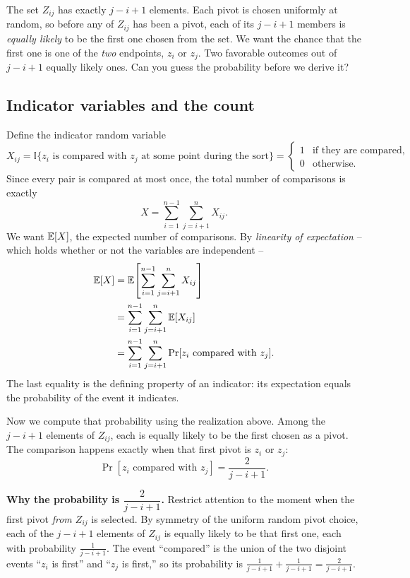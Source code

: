 \begin{walkbox}
The set $Z_{ij}$ has exactly $j - i + 1$ elements. Each pivot is chosen uniformly at
random, so before any of $Z_{ij}$ has been a pivot, each of its $j-i+1$ members
is \emph{equally likely} to be the first one chosen from the set. We want the
chance that the first one is one of the \emph{two} endpoints, $z_i$ or $z_j$.
Two favorable outcomes out of $j-i+1$ equally likely ones. Can you guess the
probability before we derive it?
\end{walkbox}

\subsection{Indicator variables and the count}

Define the indicator random variable
\[
X_{ij} = \mathbb{I}\{z_i \text{ is compared with } z_j \text{ at some point during the sort}\}
       = \begin{cases} 1 & \text{if they are compared}, \\ 0 & \text{otherwise}. \end{cases}
\]
Since every pair is compared at most once, the total number of comparisons is
exactly
\[
X = \sum_{i=1}^{n-1} \sum_{j=i+1}^{n} X_{ij}.
\]
We want $\mathbb{E}[X]$, the expected number of comparisons. By \emph{linearity of
expectation} -- which holds whether or not the variables are independent --
\begin{align*}
\mathbb{E}[X] &= \mathbb{E}\!\left[\sum_{i=1}^{n-1}\sum_{j=i+1}^{n} X_{ij}\right] \\
      &= \sum_{i=1}^{n-1}\sum_{j=i+1}^{n} \mathbb{E}[X_{ij}] \\
      &= \sum_{i=1}^{n-1}\sum_{j=i+1}^{n} \Pr[z_i \text{ compared with } z_j].
\end{align*}
The last equality is the defining property of an indicator: its expectation
equals the probability of the event it indicates.

Now we compute that probability using the realization above. Among the $j-i+1$
elements of $Z_{ij}$, each is equally likely to be the first chosen as a pivot.
The comparison happens exactly when that first pivot is $z_i$ or $z_j$:
\[
\Pr[z_i \text{ compared with } z_j]
   = \frac{2}{j - i + 1}.
\]

\begin{formalbox}
\textbf{Why the probability is $\dfrac{2}{j-i+1}$.} Restrict attention to the
moment when the first pivot \emph{from $Z_{ij}$} is selected. By symmetry of the
uniform random pivot choice, each of the $j-i+1$ elements of $Z_{ij}$ is equally
likely to be that first one, each with probability $\frac{1}{j-i+1}$. The event
``compared'' is the union of the two disjoint events ``$z_i$ is first'' and
``$z_j$ is first,'' so its probability is $\frac{1}{j-i+1} + \frac{1}{j-i+1} =
\frac{2}{j-i+1}$.
\end{formalbox}

